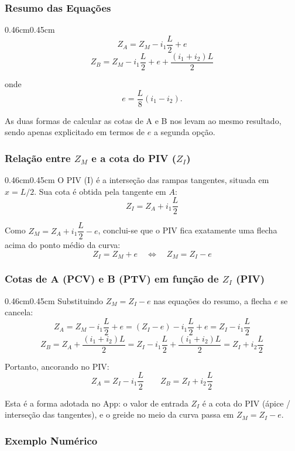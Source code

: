 \documentclass[12pt,letterpaper]{article}
\newenvironment{corpo}{\begin{adjustwidth}{0.46cm}{0.45cm}\justifying}{\end{adjustwidth}}
\begin{document}
\subsubsection*{Resumo das Equações}

\begin{corpo}
\[
 Z_A=Z_M-i_1\frac{L}{2}+e
\]
\[
 Z_B=Z_M-i_1\frac{L}{2}+e+\frac{(i_1+i_2)L}{2}
\]

onde
\[
 e=\frac{L}{8}(i_1-i_2).
\]

As duas formas de calcular as cotas de A e B nos levam ao mesmo resultado, sendo apenas explicitado em termos de $e$ a segunda opção.
\end{corpo}

\subsubsection*{Relação entre $Z_M$ e a cota do PIV ($Z_I$)}

\begin{corpo}
O PIV (I) é a interseção das rampas tangentes, situada em $x=L/2$. Sua cota é obtida pela tangente em $A$:
\[
 Z_I=Z_A+i_1\frac{L}{2}
\]

Como $Z_M=Z_A+i_1\dfrac{L}{2}-e$, conclui-se que o PIV fica exatamente uma flecha acima do ponto médio da curva:
\[
 Z_I=Z_M+e \quad\Longleftrightarrow\quad Z_M=Z_I-e
\]
\end{corpo}

\subsubsection*{Cotas de A (PCV) e B (PTV) em função de $Z_I$ (PIV)}

\begin{corpo}
Substituindo $Z_M=Z_I-e$ nas equações do resumo, a flecha $e$ se cancela:
\[
 Z_A=Z_M-i_1\frac{L}{2}+e=(Z_I-e)-i_1\frac{L}{2}+e=Z_I-i_1\frac{L}{2}
\]
\[
 Z_B=Z_A+\frac{(i_1+i_2)L}{2}=Z_I-i_1\frac{L}{2}+\frac{(i_1+i_2)L}{2}=Z_I+i_2\frac{L}{2}
\]

Portanto, ancorando no PIV:
\[
 Z_A=Z_I-i_1\frac{L}{2} \qquad Z_B=Z_I+i_2\frac{L}{2}
\]

Esta é a forma adotada no App: o valor de entrada $Z_I$ é a cota do PIV (ápice / interseção das tangentes), e o greide no meio da curva passa em $Z_M=Z_I-e$.
\end{corpo}

\subsubsection*{Exemplo Numérico}
\end{document}
